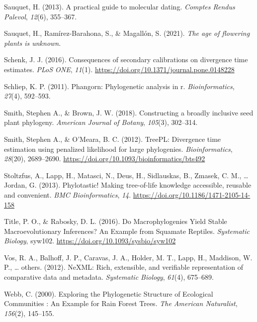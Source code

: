 \documentclass[
  english,
  man]{apa6}
\newlength{\cslhangindent}
\newlength{\cslentryspacingunit} %
\newenvironment{CSLReferences}[2] %
 {%
  \setlength{\parindent}{0pt}
  \ifodd #1
  \let\oldpar\par
  \def\par{\hangindent=\cslhangindent\oldpar}
  \fi
  \setlength{\parskip}{#2\cslentryspacingunit}
 }%
 {}
\begin{document}
\begin{CSLReferences}{1}{0}
\leavevmode{}%
Sauquet, H. (2013). A practical guide to molecular dating. \emph{{Comptes Rendus Palevol}}, \emph{12}(6), 355--367.

\leavevmode{}%
Sauquet, H., Ramírez-Barahona, S., \& Magallón, S. (2021). \emph{The age of flowering plants is unknown}.

\leavevmode{}%
Schenk, J. J. (2016). {Consequences of secondary calibrations on divergence time estimates}. \emph{PLoS ONE}, \emph{11}(1). \url{https://doi.org/10.1371/journal.pone.0148228}

\leavevmode{}%
Schliep, K. P. (2011). Phangorn: Phylogenetic analysis in r. \emph{Bioinformatics}, \emph{27}(4), 592--593.

\leavevmode{}%
Smith, Stephen A., \& Brown, J. W. (2018). Constructing a broadly inclusive seed plant phylogeny. \emph{American Journal of Botany}, \emph{105}(3), 302--314.

\leavevmode{}%
Smith, Stephen A., \& O'Meara, B. C. (2012). {TreePL: Divergence time estimation using penalized likelihood for large phylogenies}. \emph{Bioinformatics}, \emph{28}(20), 2689--2690. \url{https://doi.org/10.1093/bioinformatics/bts492}

\leavevmode{}%
Stoltzfus, A., Lapp, H., Matasci, N., Deus, H., Sidlauskas, B., Zmasek, C. M., \ldots{} Jordan, G. (2013). {Phylotastic! Making tree-of-life knowledge accessible, reusable and convenient}. \emph{{BMC Bioinformatics}}, \emph{14}. \url{https://doi.org/10.1186/1471-2105-14-158}

\leavevmode{}%
Title, P. O., \& Rabosky, D. L. (2016). {Do Macrophylogenies Yield Stable Macroevolutionary Inferences? An Example from Squamate Reptiles}. \emph{Systematic Biology}, syw102. \url{https://doi.org/10.1093/sysbio/syw102}

\leavevmode{}%
Vos, R. A., Balhoff, J. P., Caravas, J. A., Holder, M. T., Lapp, H., Maddison, W. P., \ldots{} others. (2012). NeXML: Rich, extensible, and verifiable representation of comparative data and metadata. \emph{Systematic Biology}, \emph{61}(4), 675--689.

\leavevmode{}%
Webb, C. (2000). {Exploring the Phylogenetic Structure of Ecological Communities : An Example for Rain Forest Trees}. \emph{{The American Naturalist}}, \emph{156}(2), 145--155.


\end{CSLReferences}
\end{document}
